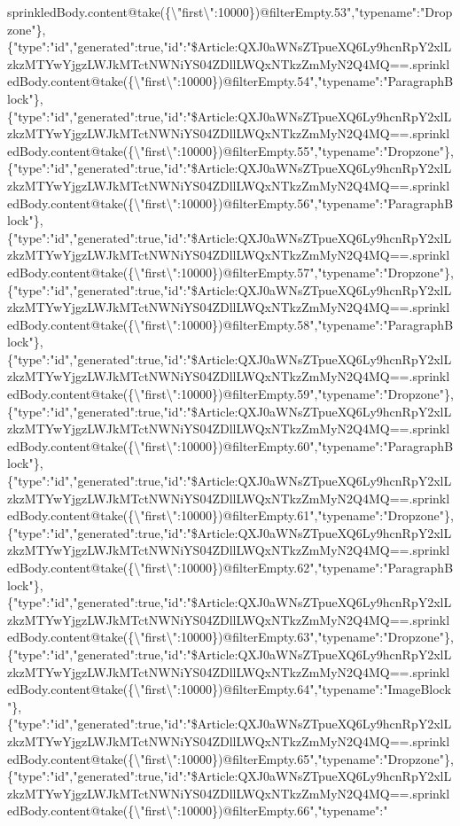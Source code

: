 sprinkledBody.content@take(\{\textbackslash{}"first\textbackslash{}":10000\})@filterEmpty.53","typename":"Dropzone"\},\{"type":"id","generated":true,"id":"\$Article:QXJ0aWNsZTpueXQ6Ly9hcnRpY2xlLzkzMTYwYjgzLWJkMTctNWNiYS04ZDllLWQxNTkzZmMyN2Q4MQ==.sprinkledBody.content@take(\{\textbackslash{}"first\textbackslash{}":10000\})@filterEmpty.54","typename":"ParagraphBlock"\},\{"type":"id","generated":true,"id":"\$Article:QXJ0aWNsZTpueXQ6Ly9hcnRpY2xlLzkzMTYwYjgzLWJkMTctNWNiYS04ZDllLWQxNTkzZmMyN2Q4MQ==.sprinkledBody.content@take(\{\textbackslash{}"first\textbackslash{}":10000\})@filterEmpty.55","typename":"Dropzone"\},\{"type":"id","generated":true,"id":"\$Article:QXJ0aWNsZTpueXQ6Ly9hcnRpY2xlLzkzMTYwYjgzLWJkMTctNWNiYS04ZDllLWQxNTkzZmMyN2Q4MQ==.sprinkledBody.content@take(\{\textbackslash{}"first\textbackslash{}":10000\})@filterEmpty.56","typename":"ParagraphBlock"\},\{"type":"id","generated":true,"id":"\$Article:QXJ0aWNsZTpueXQ6Ly9hcnRpY2xlLzkzMTYwYjgzLWJkMTctNWNiYS04ZDllLWQxNTkzZmMyN2Q4MQ==.sprinkledBody.content@take(\{\textbackslash{}"first\textbackslash{}":10000\})@filterEmpty.57","typename":"Dropzone"\},\{"type":"id","generated":true,"id":"\$Article:QXJ0aWNsZTpueXQ6Ly9hcnRpY2xlLzkzMTYwYjgzLWJkMTctNWNiYS04ZDllLWQxNTkzZmMyN2Q4MQ==.sprinkledBody.content@take(\{\textbackslash{}"first\textbackslash{}":10000\})@filterEmpty.58","typename":"ParagraphBlock"\},\{"type":"id","generated":true,"id":"\$Article:QXJ0aWNsZTpueXQ6Ly9hcnRpY2xlLzkzMTYwYjgzLWJkMTctNWNiYS04ZDllLWQxNTkzZmMyN2Q4MQ==.sprinkledBody.content@take(\{\textbackslash{}"first\textbackslash{}":10000\})@filterEmpty.59","typename":"Dropzone"\},\{"type":"id","generated":true,"id":"\$Article:QXJ0aWNsZTpueXQ6Ly9hcnRpY2xlLzkzMTYwYjgzLWJkMTctNWNiYS04ZDllLWQxNTkzZmMyN2Q4MQ==.sprinkledBody.content@take(\{\textbackslash{}"first\textbackslash{}":10000\})@filterEmpty.60","typename":"ParagraphBlock"\},\{"type":"id","generated":true,"id":"\$Article:QXJ0aWNsZTpueXQ6Ly9hcnRpY2xlLzkzMTYwYjgzLWJkMTctNWNiYS04ZDllLWQxNTkzZmMyN2Q4MQ==.sprinkledBody.content@take(\{\textbackslash{}"first\textbackslash{}":10000\})@filterEmpty.61","typename":"Dropzone"\},\{"type":"id","generated":true,"id":"\$Article:QXJ0aWNsZTpueXQ6Ly9hcnRpY2xlLzkzMTYwYjgzLWJkMTctNWNiYS04ZDllLWQxNTkzZmMyN2Q4MQ==.sprinkledBody.content@take(\{\textbackslash{}"first\textbackslash{}":10000\})@filterEmpty.62","typename":"ParagraphBlock"\},\{"type":"id","generated":true,"id":"\$Article:QXJ0aWNsZTpueXQ6Ly9hcnRpY2xlLzkzMTYwYjgzLWJkMTctNWNiYS04ZDllLWQxNTkzZmMyN2Q4MQ==.sprinkledBody.content@take(\{\textbackslash{}"first\textbackslash{}":10000\})@filterEmpty.63","typename":"Dropzone"\},\{"type":"id","generated":true,"id":"\$Article:QXJ0aWNsZTpueXQ6Ly9hcnRpY2xlLzkzMTYwYjgzLWJkMTctNWNiYS04ZDllLWQxNTkzZmMyN2Q4MQ==.sprinkledBody.content@take(\{\textbackslash{}"first\textbackslash{}":10000\})@filterEmpty.64","typename":"ImageBlock"\},\{"type":"id","generated":true,"id":"\$Article:QXJ0aWNsZTpueXQ6Ly9hcnRpY2xlLzkzMTYwYjgzLWJkMTctNWNiYS04ZDllLWQxNTkzZmMyN2Q4MQ==.sprinkledBody.content@take(\{\textbackslash{}"first\textbackslash{}":10000\})@filterEmpty.65","typename":"Dropzone"\},\{"type":"id","generated":true,"id":"\$Article:QXJ0aWNsZTpueXQ6Ly9hcnRpY2xlLzkzMTYwYjgzLWJkMTctNWNiYS04ZDllLWQxNTkzZmMyN2Q4MQ==.sprinkledBody.content@take(\{\textbackslash{}"first\textbackslash{}":10000\})@filterEmpty.66","typename":"